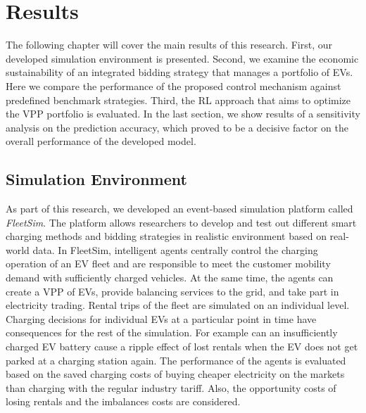 \documentclass[a4paper, 12pt]{article}
\begin{document}
\clearpage

\section{Results}
\label{sec:org96e143c}
The following chapter will cover the main results of this research. First, our
developed simulation environment is presented. Second, we examine the economic
sustainability of an integrated bidding strategy that manages a portfolio of
EVs. Here we compare the performance of the proposed control mechanism against
predefined benchmark strategies. Third, the RL approach that aims to optimize
the VPP portfolio is evaluated. In the last section, we show results of a
sensitivity analysis on the prediction accuracy, which proved to be a decisive
factor on the overall performance of the developed model.

\subsection{Simulation Environment}
\label{sec:org15917cf}
As part of this research, we developed an event-based simulation platform called
\emph{FleetSim}. The platform allows researchers to develop and test out different
smart charging methods and bidding strategies in realistic environment based on
real-world data. In FleetSim, intelligent agents centrally control the charging
operation of an EV fleet and are responsible to meet the customer mobility
demand with sufficiently charged vehicles. At the same time, the agents can
create a VPP of EVs, provide balancing services to the grid, and take part in
electricity trading. Rental trips of the fleet are simulated on an individual
level. Charging decisions for individual EVs at a particular point in time have
consequences for the rest of the simulation. For example can an insufficiently
charged EV battery cause a ripple effect of lost rentals when the EV does not
get parked at a charging station again. The performance of the agents is
evaluated based on the saved charging costs of buying cheaper electricity on the
markets than charging with the regular industry tariff. Also, the opportunity
costs of losing rentals and the imbalances costs are considered.
\end{document}
